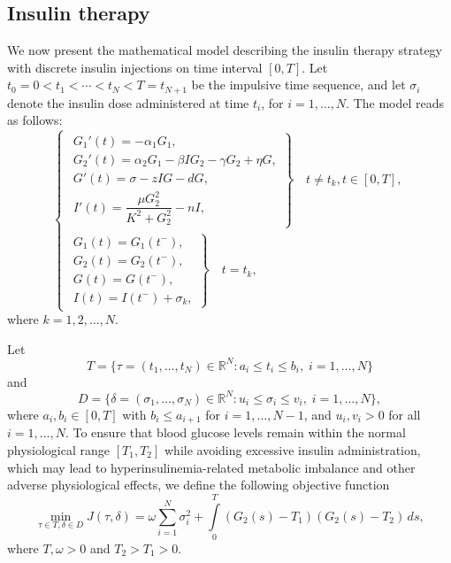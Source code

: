 \documentclass[a4paper,fleqn]{cas-sc}
\numberwithin{equation}{section}
\numberwithin{equation}{section}
\newcommand{\1}{\boldsymbol{1}}
\newcommand{\0}{\boldsymbol{0}}
\begin{document}
\subsection{Insulin therapy}
We now present the mathematical model describing the insulin therapy strategy with discrete insulin injections on time interval $[0,T]$. Let $t_0 = 0<t_1<\cdots<t_N<T=t_{N+1}$
be the impulsive time sequence, and let $\sigma_i$ denote the insulin dose administered at time $t_i$, for $i=1,\ldots,N$. The model reads as follows:
\begin{equation}\label{eq:insulin therapy}
\left\{
\begin{array}{l}

\left.
\begin{array}{l}
G_1'(t) = -\alpha_1 G_1, \\
G_2'(t) = \alpha_2 G_1
         - \beta IG_2
         - \gamma G_2 + \eta G,\\
G'(t)   = \sigma
         - z I G
         - d G, \\
I'(t)   = \dfrac{\mu G_2^2}{K^2 + G_2^2}
         - n I,
\end{array}
\right\}
\quad t \neq t_k, t \in [0,T], \\

\left.
\begin{array}{l}
G_1(t) = G_1(t^-), \\
G_2(t) = G_2(t^-), \\
G(t) = G(t^-), \\
I(t) = I(t^-) + \sigma_k,
\end{array}
\right\}
\quad t = t_k,

\end{array}
\right.
\end{equation}
where $k = 1,2,\ldots,N$.

Let 
\[
T = \{\tau = (t_1,\ldots,t_N) \in \mathbb{R}^N : a_i \le t_i \le b_i,\; i=1,\ldots,N\}
\]
and
\[
D = \{\delta = (\sigma_1,\ldots,\sigma_N) \in \mathbb{R}^N : u_i \le \sigma_i \le v_i,\; i=1,\ldots,N\},
\]
where \(a_i,b_i \in [0,T]\) with \(b_i \le a_{i+1}\) for \(i=1,\ldots,N-1\), and \(u_i,v_i>0\) for all \(i=1,\ldots,N\). To ensure that blood glucose levels remain within the normal physiological range $[T_1, T_2]$ while avoiding excessive insulin administration, which may lead to hyperinsulinemia-related metabolic imbalance and other adverse physiological effects, we define the following objective function
\begin{equation}\label{Obj 1}
    \underset{\tau \in T, \delta \in D}{\min} J(\tau, \delta) = \omega\displaystyle\sum_{i=1}^{N} \sigma_i^2 + \int\limits_0^T (G_2(s) - T_1)(G_2(s)-T_2)\, ds,
\end{equation}
where $T, \omega > 0$ and $T_2 > T_1 > 0$.
\end{document}
